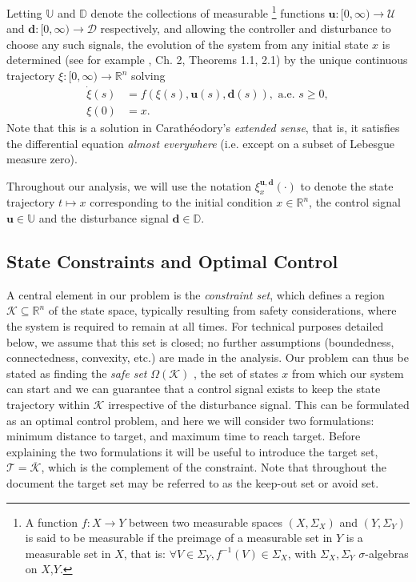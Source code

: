 \documentclass{journal}
\newcommand{\D}{\mathcal{D}}
\newcommand{\K}{\mathcal{K}}
\newcommand{\T}{\mathcal{T}}
\newcommand{\U}{\mathcal{U}}
\newcommand{\DD}{\mathbb{D}}
\newcommand{\RR}{\mathbb{R}}
\newcommand{\UU}{\mathbb{U}}
\newcommand{\bu}{\bm{u}}
\newcommand{\bdelta}{\bm{d}}
\newcommand{\bx}{\xi}
\begin{document}
Letting $\UU $ and $\DD$ denote the collections of measurable%
	\footnote{A function $f:X\to Y$ between two measurable spaces $(X,\Sigma_X)$ and $(Y,\Sigma_Y)$
	is said to be measurable if the preimage of a measurable set in $Y$ is a measurable set in $X$, that is:
	$\forall V\in\Sigma_Y, f^{-1}(V)\in\Sigma_X$, with $\Sigma_X,\Sigma_Y$ $\sigma$-algebras on $X$,$Y$.}
functions $\bm u: [0,\infty)\to \U $ and $\bm d: [0,\infty)\to \D$ respectively,
and allowing the controller and disturbance to choose any such signals,
the evolution of the system
from any initial state $x$
is determined (see for example \cite{Coddington1955}, Ch. 2, Theorems 1.1, 2.1) by the unique continuous trajectory $\bx:[0,\infty)\to\RR^n$ solving
\begin{equation}\label{eq:xdot}
\begin{split}
\dot{\bx}(s) &= f(\bx(s),\bu(s),\bdelta(s)), \text{ a.e. }s\ge 0,\\
\bx(0) &= x.
\end{split}
\end{equation}
Note that this is a solution in Carath\'eodory's \emph{extended sense}, that is, it satisfies the differential equation \emph{almost everywhere} (i.e. except on a subset of Lebesgue measure zero).


Throughout our analysis, we will use the notation $\bx_{x}^{\bu,\bdelta}(\cdot)$ to denote the state trajectory $t\mapsto x$ corresponding to the initial condition $x\in\RR^n$, the control signal $\bu\in\UU$ and the disturbance signal $\bdelta\in\DD$.



\subsection{State Constraints and Optimal Control}\label{subsec:formulation_constraints}
A central element in our problem is the \emph{constraint set}, which defines a region $\K\subseteq \RR^n$ of the state space, typically resulting from safety considerations, where the system is required to remain at all times. For technical purposes detailed below, we assume that this set is closed; no further assumptions (boundedness, connectedness, convexity, etc.) are made in the analysis. Our problem can thus be stated as finding the \emph{safe set} $\Omega(\K)$ , the set of states $x$ from which our system can start and we can guarantee that a control signal exists to keep the state trajectory within $\K$ irrespective of the disturbance signal. This can be formulated as an optimal control problem, and here we will consider two formulations: minimum distance to target, and maximum time to reach target. Before explaining the two formulations it will be useful to introduce the target set, $\T=\overline{\K}$, which is the complement of the constraint. Note that throughout the document the target set may be referred to as the keep-out set or avoid set. 
\end{document}
